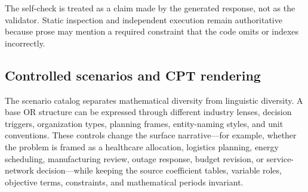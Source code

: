 The self-check is treated as a claim made by the generated response, not as the
validator.  Static inspection and independent execution remain authoritative
because prose may mention a required constraint that the code omits or indexes
incorrectly.

\subsection{Controlled scenarios and CPT rendering}
\label{app:orcpt-scenarios}

The scenario catalog separates mathematical diversity from linguistic
diversity.  A base OR structure can be expressed through different industry
lenses, decision triggers, organization types, planning frames, entity-naming
styles, and unit conventions.  These controls change the surface narrative---for
example, whether the problem is framed as a healthcare allocation, logistics
planning, energy scheduling, manufacturing review, outage response, budget
revision, or service-network decision---while keeping the source coefficient
tables, variable roles, objective terms, constraints, and mathematical periods
invariant.


